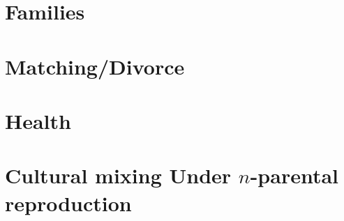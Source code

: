 \documentclass{report}
\begin{document}
\section*{Families}


\section*{Matching/Divorce}


\section*{Health}


\section*{Cultural mixing Under $n$-parental reproduction}






{}


\clearpage
\end{document}
